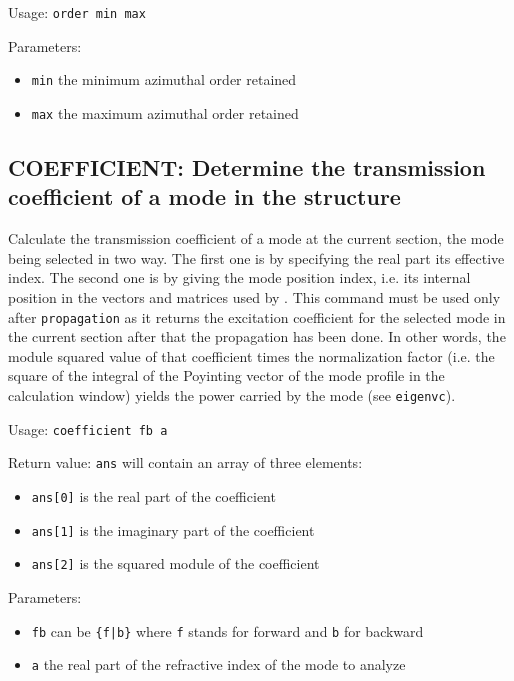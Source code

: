     Usage: \lstinline!order min max!
    
    Parameters:
    \begin{itemize}
    \item\lstinline!min! the minimum azimuthal order retained
    \item\lstinline!max! the maximum azimuthal order retained
    \end{itemize}
    
\subsection{COEFFICIENT: Determine the transmission coefficient of a mode in the    structure}
    Calculate the transmission coefficient of a mode at the current section, the mode being selected in two way. The first one is by specifying the real part its effective index. The second one is by giving the mode position index, i.e. its internal position in the vectors and matrices used by \afmm . This command must be used only after \lstinline!propagation! as it returns the excitation coefficient for the selected mode in the current section after that the propagation has been done. In other words, the module squared value of that coefficient times the normalization factor (i.e. the square of the integral of the Poyinting vector of the mode profile in the calculation window) yields the power carried by the mode (see \lstinline!eigenvc!).
    
    Usage: \lstinline!coefficient fb a!
    
    Return value: \lstinline!ans! will contain an array of three elements:
    \begin{itemize}
    \item\lstinline!ans[0]! is the real part of the coefficient
    \item\lstinline!ans[1]! is the imaginary part of the coefficient
    \item\lstinline!ans[2]! is the squared module of the coefficient
    \end{itemize}
    
    Parameters:
    \begin{itemize}
    \item\lstinline!fb! can be \lstinline!{f|b}! where \lstinline!f! stands for forward and \lstinline!b! for backward
    \item\lstinline!a!  the real part of the refractive index of the mode to analyze
    \end{itemize}
    
